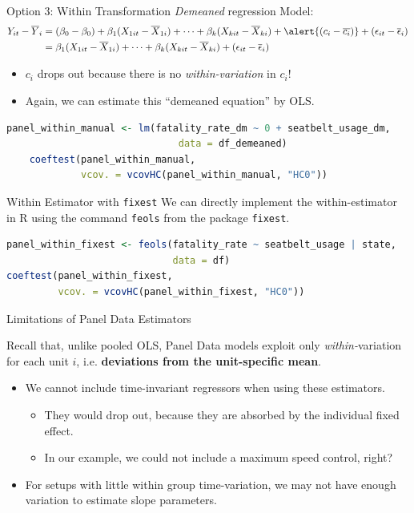 \documentclass[9pt,aspectratio=169]{beamer}
\begin{document}
\begin{frame}[fragile]{Option 3: Within Transformation}
\textit{Demeaned} regression Model:
\begin{align*}
Y_{it}-\overline{Y}_{i} 
&= (\beta_0 - \beta_0)
  + \beta_1(X_{1it}-\overline{X}_{1i})
  + \cdots
  + \beta_k(X_{kit}-\overline{X}_{ki})
  + \alert{(c_i - \overline{c_i})}
  + (\epsilon_{it}-\overline{\epsilon}_i) \\
&= \beta_1(X_{1it}-\overline{X}_{1i})
  + \cdots
  + \beta_k(X_{kit}-\overline{X}_{ki})
  + (\epsilon_{it}-\overline{\epsilon}_i)
\end{align*}
\vspace{-1cm}
\begin{itemize}
    \item \alert{$c_i$} drops out because there is no \textit{within-variation} in $c_i$!
    \item Again, we can estimate this “demeaned equation” by OLS.
\end{itemize}
\pause
\begin{lstlisting}[language=R]
    panel_within_manual <- lm(fatality_rate_dm ~ 0 + seatbelt_usage_dm, 
                              data = df_demeaned)
    coeftest(panel_within_manual, 
             vcov. = vcovHC(panel_within_manual, "HC0"))
\end{lstlisting}
\end{frame}

\begin{frame}[fragile]{Within Estimator with \texttt{fixest}}
We can directly implement the within-estimator in R using the command
\alert{\texttt{feols}} from the package \alert{\texttt{fixest}}.
\pause
\begin{lstlisting}[language=R]
panel_within_fixest <- feols(fatality_rate ~ seatbelt_usage | state, 
                             data = df)
coeftest(panel_within_fixest, 
         vcov. = vcovHC(panel_within_fixest, "HC0"))
\end{lstlisting}
\end{frame}

\begin{frame}{Limitations of Panel Data Estimators}

Recall that, unlike pooled OLS, Panel Data models exploit only \textit{within-}variation for each unit $i$, i.e. \textbf{deviations from the unit-specific mean}. \pause
\begin{itemize}
    \item \alert{We cannot include time-invariant regressors} when using these estimators. 
    \begin{itemize}
        \item They would drop out, because they are absorbed by the individual fixed effect.
        \item In our example, we could not include a maximum speed control, right?
    \end{itemize} \pause
    \item For setups with little within group time-variation, we may \alert{not have enough variation} to estimate slope parameters.
\end{itemize}
\end{frame}
\end{document}

